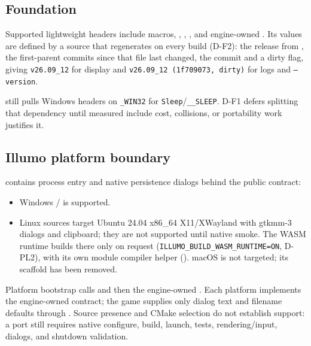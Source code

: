 \subsection{Foundation}
Supported lightweight headers include macros, ,
, , and engine-owned
. Its values are defined by a source that
 regenerates on every build (D-F2): the
release from , the first-parent commits since that file
last changed, the commit and a dirty flag, giving \texttt{v26.09\_12} for
display and \texttt{v26.09\_12 (1f709073, dirty)} for logs and
\texttt{--version}.

\begin{statusbox}
 still pulls Windows headers on \texttt{\_WIN32} for
\texttt{Sleep}/\texttt{\_\_SLEEP}. D-F1 defers splitting that dependency until
measured include cost, collisions, or portability work justifies it.
\end{statusbox}

\subsection{Illumo platform boundary}
 contains process entry and native persistence
dialogs behind the public  contract:
\begin{itemize}
  \item Windows / is supported.
  \item Linux sources target Ubuntu 24.04 x86\_64 X11/XWayland with gtkmm-3
        dialogs and clipboard; they are not supported until native smoke.
        The WASM runtime builds there only on request
        (\texttt{ILLUMO\_BUILD\_WASM\_RUNTIME=ON}, D-PL2), with its own
        module compiler helper
        ().
        macOS is not targeted; its scaffold has been removed.
\end{itemize}
Platform bootstrap calls  and then the
engine-owned . Each platform implements the
engine-owned  contract; the game supplies only dialog text
and filename defaults through . Source presence
and CMake selection do not establish support: a port still requires native
configure, build, launch, tests, rendering/input, dialogs, and shutdown
validation.

